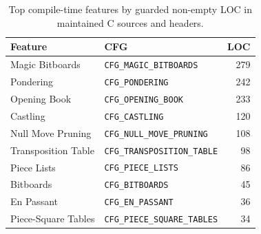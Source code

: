 \begin{table}[t]
\centering
\caption{Top compile-time features by guarded non-empty LOC in maintained C sources and headers.}
\label{tab:feature-guard-loc-top}
\begin{tabular}{llr}
\toprule
Feature & CFG & LOC \\
\midrule
Magic Bitboards & \texttt{CFG\_MAGIC\_BITBOARDS} & 279 \\
Pondering & \texttt{CFG\_PONDERING} & 242 \\
Opening Book & \texttt{CFG\_OPENING\_BOOK} & 233 \\
Castling & \texttt{CFG\_CASTLING} & 120 \\
Null Move Pruning & \texttt{CFG\_NULL\_MOVE\_PRUNING} & 108 \\
Transposition Table & \texttt{CFG\_TRANSPOSITION\_TABLE} & 98 \\
Piece Lists & \texttt{CFG\_PIECE\_LISTS} & 86 \\
Bitboards & \texttt{CFG\_BITBOARDS} & 45 \\
En Passant & \texttt{CFG\_EN\_PASSANT} & 36 \\
Piece-Square Tables & \texttt{CFG\_PIECE\_SQUARE\_TABLES} & 34 \\
\bottomrule
\end{tabular}
\end{table}
